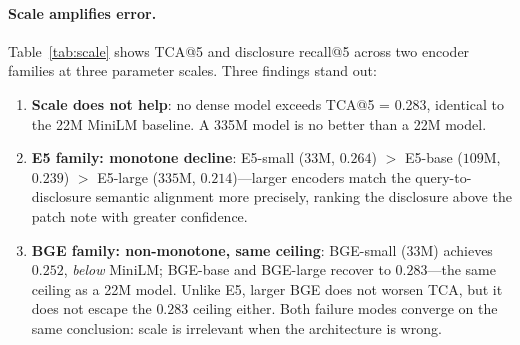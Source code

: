\documentclass[11pt]{article}
\begin{document}
\paragraph{Scale amplifies error.}
Table~\ref{tab:scale} shows TCA@5 and disclosure recall@5 across two encoder families at three parameter scales. Three findings stand out:
\begin{enumerate}[noitemsep]
  \item \textbf{Scale does not help}: no dense model exceeds TCA@5 = 0.283, identical to the 22M MiniLM baseline. A 335M model is no better than a 22M model.
  \item \textbf{E5 family: monotone decline}: E5-small ($33$M, $0.264$) $>$ E5-base ($109$M, $0.239$) $>$ E5-large ($335$M, $0.214$)---larger encoders match the query-to-disclosure semantic alignment more precisely, ranking the disclosure above the patch note with greater confidence.
  \item \textbf{BGE family: non-monotone, same ceiling}: BGE-small ($33$M) achieves $0.252$, \emph{below} MiniLM; BGE-base and BGE-large recover to $0.283$---the same ceiling as a 22M model. Unlike E5, larger BGE does not worsen TCA, but it does not escape the $0.283$ ceiling either. Both failure modes converge on the same conclusion: scale is irrelevant when the architecture is wrong.
\end{enumerate}

\begin{table}[h]
\centering
\small
{}
\caption{Scale amplifies error in the E5 family (TCA@5 monotonically decreases with parameters), while BGE saturates at the same ceiling as MiniLM. No dense model exceeds TCA@5 = 0.283 regardless of scale. The two-stage pipeline achieves 0.975 with \emph{no trained parameters}, a $3.4\times$ improvement over any dense baseline.
Artifact: \texttt{data/ghsa\_scale\_results.json}.}
\label{tab:scale}
\end{table}
\end{document}
